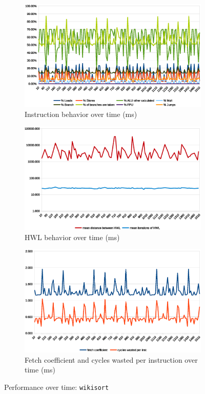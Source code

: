 \documentclass[../bachelor_paper.tex]{subfiles}
\begin{document}
\begin{figure}
    \begin{subfigure}{0.45\textwidth}
        \includegraphics[width=\textwidth]{img/graph/embench/wikisort_inst.eps}
        \caption{Instruction behavior over time (ms)}
    \end{subfigure}
    \begin{subfigure}{0.45\textwidth}
        \includegraphics[width=\textwidth]{img/graph/embench/wikisort_hwl.eps}
        \caption{\ac{HWL} behavior over time (ms)}
    \end{subfigure}
    \begin{subfigure}{0.45\textwidth}
        \includegraphics[width=\textwidth]{img/graph/embench/wikisort_fetch_waste.eps}
        \caption{Fetch coefficient and cycles wasted per instruction over time (ms)}
    \end{subfigure}
    \caption{Performance over time: \texttt{wikisort}}
\end{figure}
\end{document}
